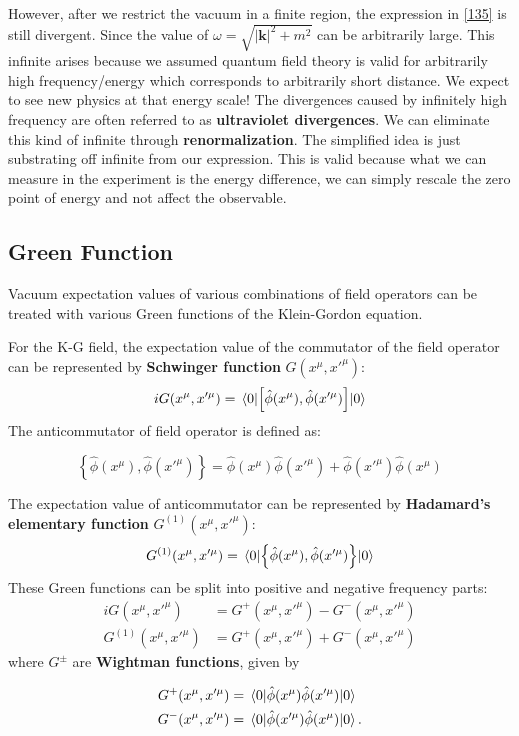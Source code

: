 \documentclass[12pt]{article}
\numberwithin{equation}{subsection}
\theoremstyle{mystyle}{\newtheorem{definition}{Definition}[subsection]}
\theoremstyle{mystyle}{\newtheorem{theorem}[definition]{Theorem}}
\theoremstyle{mystyle}{\newtheorem*{remark}{Remark}}
\theoremstyle{mystyle}{\newtheorem{example}{Example}[subsection]}
\theoremstyle{mystyle}{\newtheorem{examples}{Examples}[subsection]}
\theoremstyle{mystyle}{\newtheorem{cthm}{}[subsection]}
\newcommand{\tbf}[1]{\textbf{#1}}
\begin{document}
However, after we restrict the vacuum in a finite region, the expression in \ref{135} is still divergent.
Since the value of \(\omega=\sqrt{|\mathbf{k}|^2+m^2}\) can be arbitrarily large.
This infinite arises because we assumed quantum field theory is valid for arbitrarily high frequency/energy
which corresponds to arbitrarily short distance. We expect to see new physics at that energy scale!
The divergences caused by infinitely high frequency are often referred to as \tbf{ultraviolet divergences}.
We can eliminate this kind of infinite through \tbf{renormalization}.
The simplified idea is just substrating off infinite from our expression.
This is valid because what we can measure in the experiment is the energy difference,
we can simply rescale the zero point of energy and not affect the observable.


\newpage

\subsection{Green Function}
Vacuum expectation values of various combinations of field operators can be treated with various Green functions of the Klein-Gordon equation.

For the K-G field, the expectation value of the commutator of the field operator can be represented by \tbf{Schwinger function} \(G(x^{\mu},x'^{\mu})\):
\begin{equation}
  iG(x^{\mu},x'^{\mu})=\expval{\left[\hat{\phi}(x^{\mu}),\hat{\phi}(x'^{\mu})\right]}{0}
\end{equation}
The anticommutator of field operator is defined as:
\begin{definition}[Anticommutator]
  \[\left\{\hat{\phi}(x^{\mu}),\hat{\phi}(x'^{\mu})\right\}=\hat{\phi}(x^{\mu})\hat{\phi}(x'^{\mu})+\hat{\phi}(x'^{\mu})\hat{\phi}(x^{\mu})\]
\end{definition}
The expectation value of anticommutator can be represented by \tbf{Hadamard's elementary function} \(G^{(1)}(x^{\mu},x'^{\mu})\):
\begin{equation}
  G^{(1)}(x^{\mu},x'^{\mu})=\expval{\left\{\hat{\phi}(x^{\mu}),\hat{\phi}(x'^{\mu})\right\}}{0}
\end{equation}
These Green functions can be split into positive and negative frequency parts:
\begin{align}
  iG(x^{\mu},x'^{\mu})      & = G^+(x^{\mu},x'^{\mu})-G^-(x^{\mu},x'^{\mu}) \\
  G^{(1)}(x^{\mu},x'^{\mu}) & =G^+(x^{\mu},x'^{\mu})+G^-(x^{\mu},x'^{\mu})
\end{align}
where \(G^{\pm}\) are \tbf{Wightman functions}, given by
\begin{cthm}
  \begin{align*}
    G^+(x^{\mu},x'^{\mu}) & =\expval{\hat{\phi}(x^{\mu})\hat{\phi}(x'^{\mu})}{0}  \\
    G^-(x^{\mu},x'^{\mu}) & =\expval{\hat{\phi}(x'^{\mu})\hat{\phi}(x^{\mu})}{0}.
  \end{align*}
\end{cthm}
\end{document}
